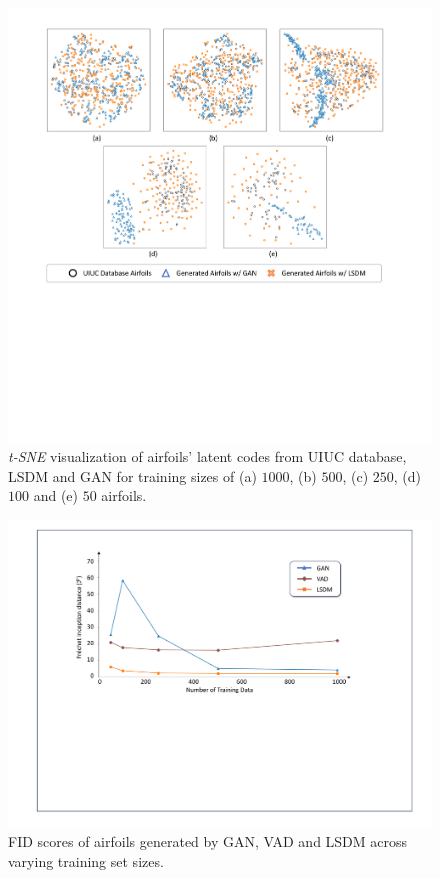 \begin{figure}[!t]
    \begin{center}
        \includegraphics[width=0.95\linewidth]{chapter6/fig/unconditional_tsne.pdf}
    \end{center}
    \caption{
        \small \textit{t-SNE} visualization of airfoils' latent codes from UIUC database, LSDM and GAN for training sizes of (a) $1000$, (b) $500$, (c) $250$, (d) $100$ and (e) $50$ airfoils.
    }
    \label{ch6:fig:main_unconditional_tsne}
\end{figure}

\begin{figure}[!h]
    \begin{center}
        \includegraphics[width=1\linewidth]{chapter6/fig/fig_fid_update.pdf}
    \end{center}
    \vspace{-4mm}
    \caption{
        \small FID scores of airfoils generated by GAN, VAD and LSDM across varying training set sizes. 
    }
    \label{ch6:fig:main_benchmark_fid}
\end{figure}

